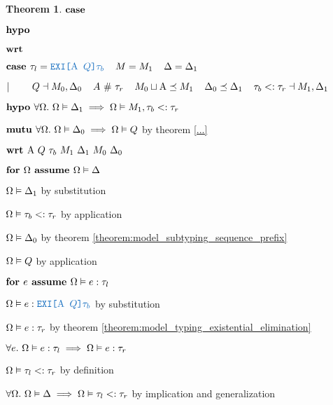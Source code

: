 \documentclass[acmsmall]{acmart}
\theoremstyle{definition}
\newtheorem{theorem}{Theorem}[section]
\begin{document}
\begin{theorem}
    \item \Z $\textbf{case } $
    \item \Z $\textbf{hypo } $
    \item \Z $\textbf{wrt } $
      \item \Z\Z {} 

    \item \Z $\B{case } 
      \tau_l = \obj{EXI[$\Alpha$ $Q$]$\tau_b$}
      \I
      M = M_1
      \I
      \Delta = \Delta_1
    $
    \item \Z $|\ \ \ \ \ \ \ 
      Q \dashv M_0, \Delta_0
      \hspace{4mm}
      A\ \#\ \tau_r
      \hspace{4mm}
      M_0 \sqcup \mathrm{A} \preceq M_1
      \hspace{4mm}
      \Delta_0 \preceq \Delta_1
      \hspace{4mm}
      \tau_b <: \tau_r
      \dashv M_1, \Delta_1
    $
    \item \Z $\textbf{hypo } 
      \forall \Omega .\ \Omega \vDash \Delta_1 \implies \Omega \vDash M_1, \tau_b <: \tau_r 
    $
    \item \Z $\textbf{mutu } 
      \forall \Omega .\ \Omega \vDash \Delta_0 \implies \Omega \vDash Q 
    $ by theorem \ref{...} 
    \item \Z $\B{wrt } \Alpha\ Q\ \tau_b\ M_1\ \Delta_1\ M_0\ \Delta_0$
      \item \Z\Z $\textbf{for } \Omega \textbf{ assume } \Omega \vDash \Delta$
        \item \Z\Z\Z $\Omega \vDash \Delta_1 $ by substitution
        \item \Z\Z\Z $\Omega \vDash \tau_b <: \tau_r$ by application
        \item \Z\Z\Z $\Omega \vDash \Delta_0 $ by theorem \ref{theorem:model_subtyping_sequence_prefix}
        \item \Z\Z\Z $\Omega \vDash Q$ by application
        \item \Z\Z\Z $\textbf{for } e \textbf{ assume } \Omega \vDash e : \tau_l$ 
          \item \Z\Z\Z\Z $\Omega \satisfies e \hastype \obj{EXI[$\Alpha$ $Q$]$\tau_b$}$ by substitution
          \item \Z\Z\Z\Z $\Omega \vDash e : \tau_r$ by theorem \ref{theorem:model_typing_existential_elimination} 
        \item \Z\Z\Z $\forall e .\ \Omega \vDash e : \tau_l 
          \implies \Omega \vDash e : \tau_r
        $ 
        \item \Z\Z\Z $\Omega \vDash \tau_l <: \tau_r$ by definition 
      \item \Z\Z $\forall \Omega .\ \Omega \vDash \Delta \implies \Omega \vDash \tau_l <: \tau_r$ 
      by implication and generalization


\end{theorem}
\end{document}
